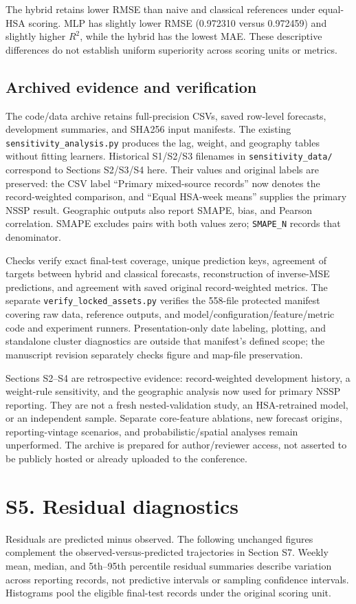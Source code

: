 \documentclass[10pt,a4paper]{article}
\begin{document}
The hybrid retains lower RMSE than naive and classical references under equal-HSA scoring. MLP has slightly lower RMSE (0.972310 versus 0.972459) and slightly higher $R^2$, while the hybrid has the lowest MAE. These descriptive differences do not establish uniform superiority across scoring units or metrics.

\subsection*{Archived evidence and verification}
The code/data archive retains full-precision CSVs, saved row-level forecasts, development summaries, and SHA256 input manifests. The existing \nolinkurl{sensitivity_analysis.py} produces the lag, weight, and geography tables without fitting learners. Historical S1/S2/S3 filenames in \nolinkurl{sensitivity_data/} correspond to Sections S2/S3/S4 here. Their values and original labels are preserved: the CSV label ``Primary mixed-source records'' now denotes the record-weighted comparison, and ``Equal HSA-week means'' supplies the primary NSSP result. Geographic outputs also report SMAPE, bias, and Pearson correlation. SMAPE excludes pairs with both values zero; \nolinkurl{SMAPE_N} records that denominator.

Checks verify exact final-test coverage, unique prediction keys, agreement of targets between hybrid and classical forecasts, reconstruction of inverse-MSE predictions, and agreement with saved original record-weighted metrics. The separate \nolinkurl{verify_locked_assets.py} verifies the 558-file protected manifest covering raw data, reference outputs, and model/configuration/feature/metric code and experiment runners. Presentation-only date labeling, plotting, and standalone cluster diagnostics are outside that manifest's defined scope; the manuscript revision separately checks figure and map-file preservation.

Sections S2--S4 are retrospective evidence: record-weighted development history, a weight-rule sensitivity, and the geographic analysis now used for primary NSSP reporting. They are not a fresh nested-validation study, an HSA-retrained model, or an independent sample. Separate core-feature ablations, new forecast origins, reporting-vintage scenarios, and probabilistic/spatial analyses remain unperformed. The archive is prepared for author/reviewer access, not asserted to be publicly hosted or already uploaded to the conference.

\clearpage
\section*{S5. Residual diagnostics}
\label{sec:S5}
Residuals are predicted minus observed. The following unchanged figures complement the observed-versus-predicted trajectories in Section S7. Weekly mean, median, and 5th--95th percentile residual summaries describe variation across reporting records, not predictive intervals or sampling confidence intervals. Histograms pool the eligible final-test records under the original scoring unit.
\end{document}
